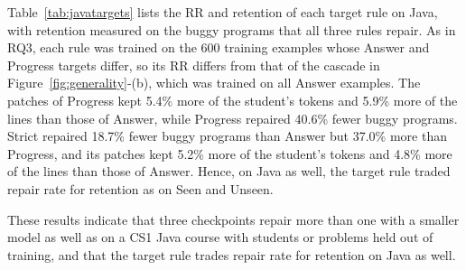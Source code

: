 \documentclass[conference]{IEEEtran}
\begin{document}
Table~\ref{tab:javatargets} lists the RR and retention of each target rule on Java, with retention measured on the buggy programs that all three rules repair. As in RQ3, each rule was trained on the 600 training examples whose Answer and Progress targets differ, so its RR differs from that of the cascade in Figure~\ref{fig:generality}-(b), which was trained on all Answer examples. The patches of Progress kept 5.4\% more of the student's tokens and 5.9\% more of the lines than those of Answer, while Progress repaired 40.6\% fewer buggy programs. Strict repaired 18.7\% fewer buggy programs than Answer but 37.0\% more than Progress, and its patches kept 5.2\% more of the student's tokens and 4.8\% more of the lines than those of Answer. Hence, on Java as well, the target rule traded repair rate for retention as on Seen and Unseen.

These results indicate that three checkpoints repair more than one with a smaller model as well as on a CS1 Java course with students or problems held out of training, and that the target rule trades repair rate for retention on Java as well.
\end{document}
